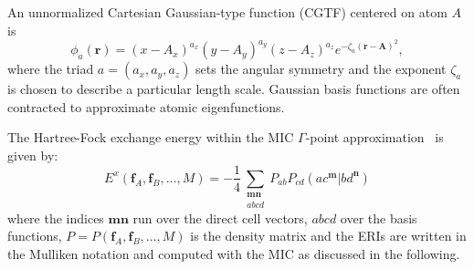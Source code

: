 \documentclass[prl,twocolumn,showpacs,twocolumngrid,superbib]{revtex4}
\def\Tr{{\rm Tr}}
\begin{document}
An unnormalized Cartesian Gaussian-type function (CGTF) centered on atom $A$ is
\begin{equation}
  \phi_a(\mathbf{r})=(x-A_x)^{a_x}(y-A_y)^{a_y}(z-A_z)^{a_z}e^{-\zeta_a(\mathbf{r-A})^2},
\end{equation}
where the triad $a=(a_x,a_y,a_z)$ sets the angular symmetry and the exponent $\zeta_a$
is chosen to describe a particular length scale. Gaussian basis functions are often
contracted to approximate atomic eigenfunctions.


The Hartree-Fock exchange energy within the MIC $\Gamma$-point approximation~\cite{CTymczak04b} 
is given by:
\begin{equation}
E^x(\mathbf{f}_A,\mathbf{f}_B,\ldots,M)=
 -\frac{1}{4}\sum_{\substack{\mathbf{m}\mathbf{n}\\a b c d}}P_{ab}P_{cd}
 (ac^\mathbf{m}|bd^\mathbf{n})
\end{equation}
where the indices $\mathbf{mn}$ run over the direct cell vectors, 
$abcd$ over the basis functions, 
$P=P(\mathbf{f}_A,\mathbf{f}_B,\ldots,M)$
is the density matrix 
and the ERIs are written in the Mulliken notation and computed 
with the MIC as discussed in the following.
\end{document}
